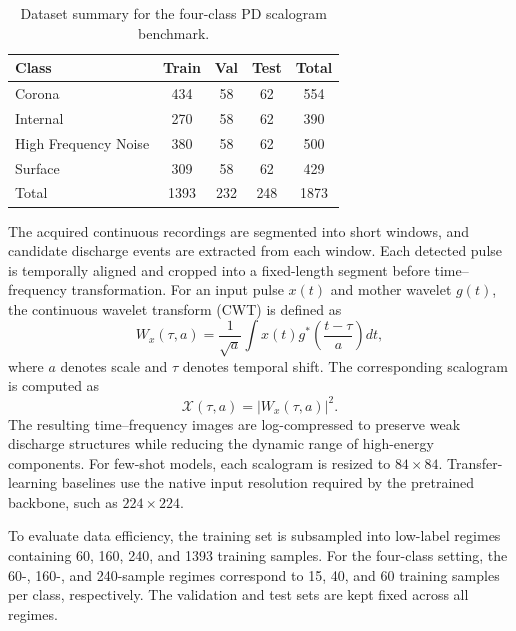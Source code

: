 \documentclass[journal]{IEEEtran}
\newcommand{\1}{\mathbf{1}}
\begin{document}
\begin{table}[t]
\centering
\caption{Dataset summary for the four-class PD scalogram benchmark.}
\label{tab:dataset_summary}
\renewcommand{\arraystretch}{1.1}
\setlength{\tabcolsep}{0pt}
\begin{tabular*}{\columnwidth}{@{\extracolsep{\fill}}lcccc@{}}
\toprule
Class & Train & Val & Test & Total \\
\midrule
Corona & 434 & 58 & 62 & 554 \\
Internal & 270 & 58 & 62 & 390 \\
High Frequency Noise & 380 & 58 & 62 & 500 \\
Surface & 309 & 58 & 62 & 429 \\
\midrule
Total & 1393 & 232 & 248 & 1873 \\
\bottomrule
\end{tabular*}
\end{table}

The acquired continuous recordings are segmented into short windows, and candidate discharge events are extracted from each window. Each detected pulse is temporally aligned and cropped into a fixed-length segment before time--frequency transformation. For an input pulse $x(t)$ and mother wavelet $g(t)$, the continuous wavelet transform (CWT) is defined as
\begin{equation}
    W_x(\tau,a)=\frac{1}{\sqrt{a}}\int x(t)g^*\left(\frac{t-\tau}{a}\right)dt,
    \label{eq:cwt}
\end{equation}
where $a$ denotes scale and $\tau$ denotes temporal shift. The corresponding scalogram is computed as
\begin{equation}
    \mathcal{X}(\tau,a)=|W_x(\tau,a)|^2 .
    \label{eq:scalogram}
\end{equation}
The resulting time--frequency images are log-compressed to preserve weak discharge structures while reducing the dynamic range of high-energy components. For few-shot models, each scalogram is resized to $84\times84$. Transfer-learning baselines use the native input resolution required by the pretrained backbone, such as $224\times224$.

To evaluate data efficiency, the training set is subsampled into low-label regimes containing 60, 160, 240, and 1393 training samples. For the four-class setting, the 60-, 160-, and 240-sample regimes correspond to 15, 40, and 60 training samples per class, respectively. The validation and test sets are kept fixed across all regimes.
\end{document}
